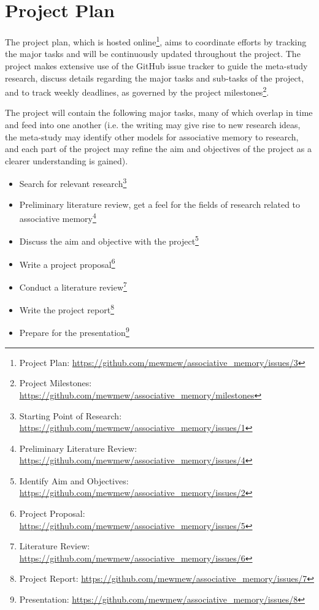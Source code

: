 \documentclass[12pt, a4paper]{article}
\begin{document}
\section{Project Plan}

The project plan, which is hosted online\footnote{Project Plan: \url{https://github.com/mewmew/associative_memory/issues/3}}, aims to coordinate efforts by tracking the major tasks and will be continuously updated throughout the project. The project makes extensive use of the GitHub issue tracker to guide the meta-study research, discuss details regarding the major tasks and sub-tasks of the project, and to track weekly deadlines, as governed by the project milestones\footnote{Project Milestones: \url{https://github.com/mewmew/associative_memory/milestones}}.

The project will contain the following major tasks, many of which overlap in time and feed into one another (i.e. the writing may give rise to new research ideas, the meta-study may identify other models for associative memory to research, and each part of the project may refine the aim and objectives of the project as a clearer understanding is gained).

\begin{itemize}
	\item Search for relevant research\footnote{Starting Point of Research: \url{https://github.com/mewmew/associative_memory/issues/1}}
	\item Preliminary literature review, get a feel for the fields of research related to associative memory\footnote{Preliminary Literature Review: \url{https://github.com/mewmew/associative_memory/issues/4}}
	\item Discuss the aim and objective with the project\footnote{Identify Aim and Objectives: \url{https://github.com/mewmew/associative_memory/issues/2}}
	\item Write a project proposal\footnote{Project Proposal: \url{https://github.com/mewmew/associative_memory/issues/5}}
	\item Conduct a literature review\footnote{Literature Review: \url{https://github.com/mewmew/associative_memory/issues/6}}
	\item Write the project report\footnote{Project Report: \url{https://github.com/mewmew/associative_memory/issues/7}}
	\item Prepare for the presentation\footnote{Presentation: \url{https://github.com/mewmew/associative_memory/issues/8}}
\end{itemize}


\end{document}
